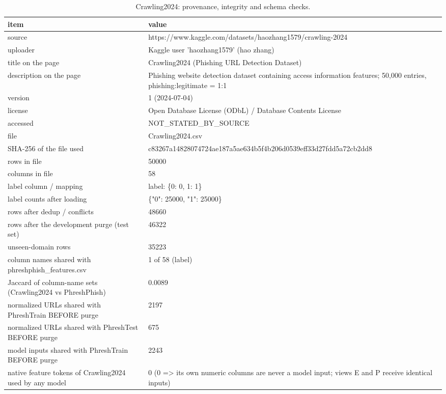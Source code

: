 \begin{table}[t]
\centering
\scriptsize
\caption{Crawling2024: provenance, integrity and schema checks.}
\label{tab:rev_R1_crawling2024_provenance}
\begin{tabular}{ll}
\toprule
item & value \\
\midrule
source & https://www.kaggle.com/datasets/haozhang1579/crawling-2024 \\
uploader & Kaggle user 'haozhang1579' (hao zhang) \\
title on the page & Crawling2024 (Phishing URL Detection Dataset) \\
description on the page & Phishing website detection dataset containing access information features; 50,000 entries, phishing:legitimate = 1:1 \\
version & 1 (2024-07-04) \\
license & Open Database License (ODbL) / Database Contents License \\
accessed & NOT\_STATED\_BY\_SOURCE \\
file & Crawling2024.csv \\
SHA-256 of the file used & c83267a14828074724ae187a5ae634b5f4b206d0539eff33d27fdd5a72cb2dd8 \\
rows in file & 50000 \\
columns in file & 58 \\
label column / mapping & label: \{0: 0, 1: 1\} \\
label counts after loading & \{"0": 25000, "1": 25000\} \\
rows after dedup / conflicts & 48660 \\
rows after the development purge (test set) & 46322 \\
unseen-domain rows & 35223 \\
column names shared with phreshphish\_features.csv & 1 of 58 (label) \\
Jaccard of column-name sets (Crawling2024 vs PhreshPhish) & 0.0089 \\
normalized URLs shared with PhreshTrain BEFORE purge & 2197 \\
normalized URLs shared with PhreshTest BEFORE purge & 675 \\
model inputs shared with PhreshTrain BEFORE purge & 2243 \\
native feature tokens of Crawling2024 used by any model & 0 (0 => its own numeric columns are never a model input; views E and P receive identical inputs) \\
\bottomrule
\end{tabular}
\end{table}